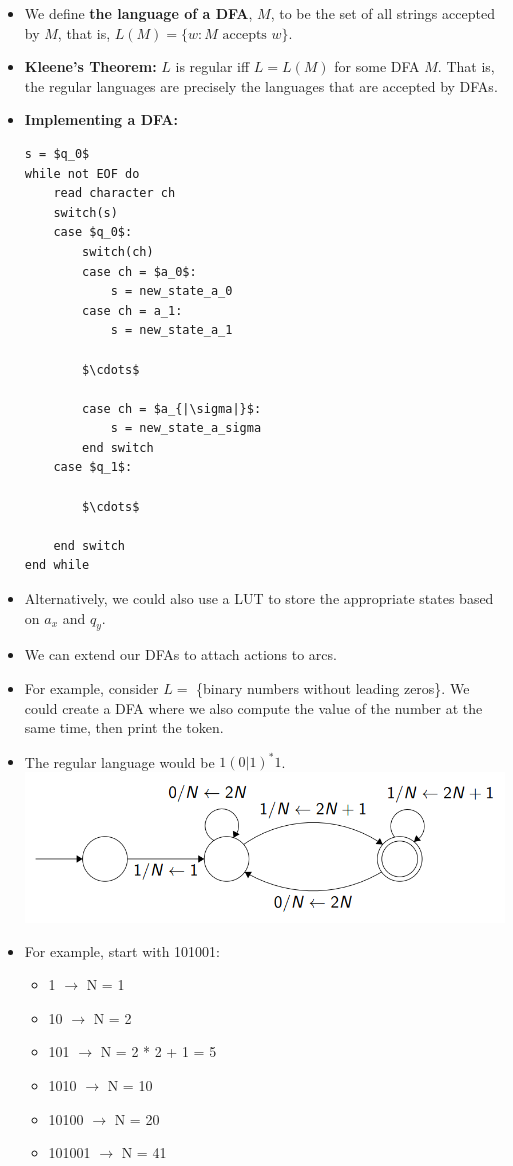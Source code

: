\documentclass[12pt]{article}
\begin{document}
\begin{itemize}
    \item We define \textbf{the language of a DFA}, $M$, to be the set of all strings accepted by $M$, that is, $L(M) = \{w : M \text{ accepts } w\}$.   
    \item \textbf{Kleene's Theorem:} $L$ is regular iff $L = L(M)$ for some DFA $M$.  That is, the regular languages are precisely the languages that are accepted by DFAs.
    \item \textbf{Implementing a DFA:}
        \begin{lstlisting}[mathescape, numbers=none, breaklines=true]
s = $q_0$
while not EOF do
    read character ch
    switch(s)
    case $q_0$:
        switch(ch)
        case ch = $a_0$:
            s = new_state_a_0
        case ch = a_1:
            s = new_state_a_1

        $\cdots$

        case ch = $a_{|\sigma|}$:
            s = new_state_a_sigma
        end switch
    case $q_1$:

        $\cdots$

    end switch
end while
        \end{lstlisting}
    \item Alternatively, we could also use a LUT to store the appropriate states based on $a_x$ and $q_y$.  
    \item We can extend our DFAs to attach actions to arcs.  
    \item For example, consider $L = $ \{binary numbers without leading zeros\}.  We could create a DFA where we also compute the value of the number at the same time, then print the token.
    \item The regular language would be $1(0 | 1)^* 1$.\\
        \includegraphics[scale=0.5]{dfa_extend.png}\\
    \item For example, start with 101001:
        \begin{itemize}
            \item 1 $\rightarrow$ N = 1
            \item 10 $\rightarrow$ N = 2
            \item 101 $\rightarrow$ N = 2 * 2 + 1 = 5
            \item 1010 $\rightarrow$ N = 10
            \item 10100 $\rightarrow$ N = 20
            \item 101001 $\rightarrow$ N = 41
        \end{itemize}  
\end{itemize}
\end{document}
